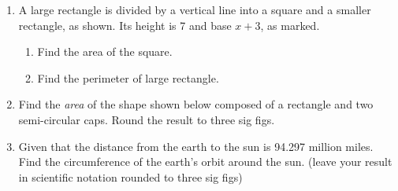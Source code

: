\begin{enumerate}
\newpage
\item A large rectangle is divided by a vertical line into a square and a smaller rectangle, as shown. Its height is 7 and base $x+3$, as marked.
\begin{multicols}{2}
  \begin{enumerate}
    \item Find the area of the square. \vspace{2cm}
    \item Find the perimeter of large rectangle.
    \end{enumerate}
  \end{multicols} \vspace{1cm}

\item Find the \emph{area} of the shape shown below composed of a rectangle and two semi-circular caps. Round the result to three sig figs.
\begin{flushright}
\end{flushright} \vspace{2cm}

\item Given that the distance from the earth to the sun is 94.297 million miles. Find the circumference of the earth's orbit around the sun. (leave your result in scientific notation rounded to three sig figs)


\end{enumerate}

